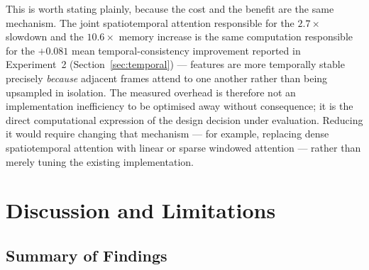 This is worth stating plainly, because the cost and the benefit are the same mechanism.
The joint spatiotemporal attention responsible for the $2.7\times$ slowdown and the $10.6\times$ memory increase is the same computation responsible for the $+0.081$ mean temporal-consistency improvement reported in Experiment~2 (Section~\ref{sec:temporal}) --- features are more temporally stable precisely \emph{because} adjacent frames attend to one another rather than being upsampled in isolation.
The measured overhead is therefore not an implementation inefficiency to be optimised away without consequence; it is the direct computational expression of the design decision under evaluation.
Reducing it would require changing that mechanism --- for example, replacing dense spatiotemporal attention with linear or sparse windowed attention --- rather than merely tuning the existing implementation.


\section{Discussion and Limitations}
\label{sec:discussion}

\subsection{Summary of Findings}
\label{sec:discussion-summary}

